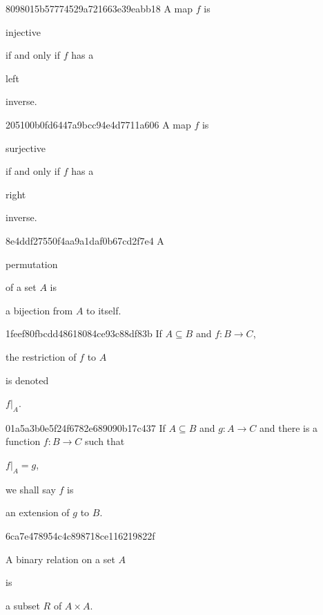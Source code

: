 \begin{note}{8098015b57774529a721663e39eabb18}
    A map \({ f }\) is \begin{icloze}{1}injective\end{icloze} if and only if \({ f }\) has a \begin{icloze}{2}left\end{icloze} inverse.
\end{note}

\begin{note}{205100b0fd6447a9bcc94e4d7711a606}
    A map \({ f }\) is \begin{icloze}{1}surjective\end{icloze} if and only if \({ f }\) has a \begin{icloze}{2}right\end{icloze} inverse.
\end{note}

\begin{note}{8e4ddf27550f4aa9a1daf0b67cd2f7e4}
    A \begin{icloze}{2}permutation\end{icloze} of a set \({ A }\) is \begin{icloze}{1}a bijection from \({ A }\) to itself.\end{icloze}
\end{note}

\begin{note}{1feef80fbcdd48618084ce93c88df83b}
    If \({ A \subseteq B  }\) and \({ f : B \to C }\), \begin{icloze}{2}the restriction of \({ f }\) to \({ A }\)\end{icloze} is denoted \begin{icloze}{1}\({ f|_{A} }\).\end{icloze}
\end{note}

\begin{note}{01a5a3b0e5f24f6782e689090b17c437}
    If \({ A \subseteq B }\) and \({ g : A \to C }\) and there is a function \({ f : B \to C }\) such that \begin{icloze}{2}\({ f|_{A} = g }\),\end{icloze} we shall say \({ f }\) is \begin{icloze}{1}an extension of \({ g }\) to \({ B }\).\end{icloze}
\end{note}

\begin{note}{6ca7e478954c4c898718ce116219822f}
    \begin{icloze}{2}A binary relation on a set \({ A }\)\end{icloze} is \begin{icloze}{1}a subset \({ R }\) of \({ A \times A }\).\end{icloze}
\end{note}

